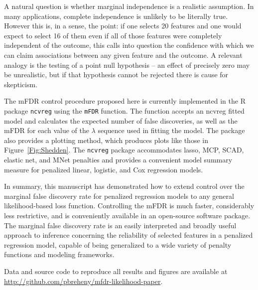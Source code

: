 A natural question is whether marginal independence is a realistic assumption.  In many applications, complete independence is unlikely to be literally true.  However this is, in a sense, the point: if one selects 20 features and one would expect to select 16 of them even if all of those features were completely independent of the outcome, this calls into question the confidence with which we can claim associations between any given feature and the outcome.  A relevant analogy is the testing of a point null hypothesis -- an effect of precisely zero may be unrealistic, but if that hypothesis cannot be rejected there is cause for skepticism.

The mFDR control procedure proposed here is currently implemented in the R package {\tt ncvreg} \citep{Breheny2011} using the {\tt mFDR} function. The function accepts an ncvreg fitted model and calculates the expected number of false discoveries, as well as the mFDR for each value of the $\lambda$ sequence used in fitting the model.  The package also provides a plotting method, which produces plots like those in Figure~\ref{Fig:Shedden}.  The {\tt ncvreg} package accommodates lasso, MCP, SCAD, elastic net, and MNet \citep{Huang2016} penalties and provides a convenient model summary measure for penalized linear, logistic, and Cox regression models.

In summary, this manuscript has demonstrated how to extend control over the marginal false discovery rate for penalized regression models to any general likelihood-based loss function.  Controlling the mFDR is much faster, considerably less restrictive, and is conveniently available in an open-source software package.  The marginal false discovery rate is an easily interpreted and broadly useful approach to inference concerning the reliability of selected features in a penalized regression model, capable of being generalized to a wide variety of penalty functions and modeling frameworks.

\bigskip


\noindent Data and source code to reproduce all results and figures are available at \url{http://github.com/pbreheny/mfdr-likelihood-paper}.
